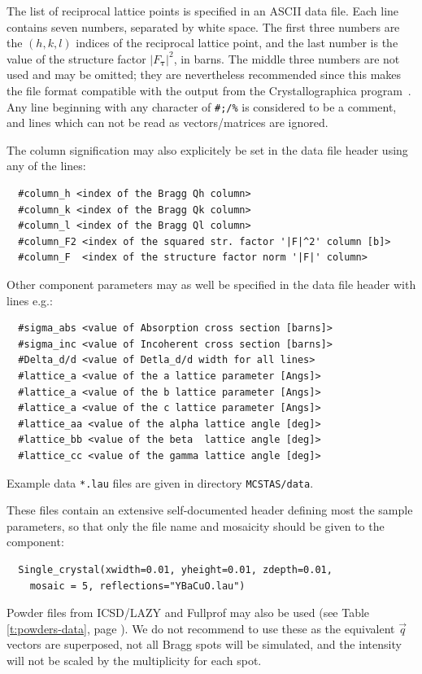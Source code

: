 The list of reciprocal lattice points is specified in an ASCII data
file. Each line contains seven numbers, separated by white space. The
first three numbers are the $(h,k,l)$ indices of the reciprocal lattice
point, and the last number is the value of the structure factor
$|F_{\boldsymbol{\tau}}|^2$, in barns. The middle three numbers are not
used and may be omitted; they are nevertheless recommended since this makes
the file format compatible with the output from the Crystallographica
program~\cite{crystallographica}.
Any line beginning with any character of \verb+#;/%+ is considered to be a
comment, and lines which can not be read as vectors/matrices are ignored.

The column signification may also explicitely be set in the data file header using any of the lines:
\begin{verbatim}
  #column_h <index of the Bragg Qh column>
  #column_k <index of the Bragg Qk column>
  #column_l <index of the Bragg Ql column>
  #column_F2 <index of the squared str. factor '|F|^2' column [b]>
  #column_F  <index of the structure factor norm '|F|' column>
\end{verbatim}

Other component parameters may as well be specified in the data file
header with lines e.g.:
\begin{verbatim}
  #sigma_abs <value of Absorption cross section [barns]>
  #sigma_inc <value of Incoherent cross section [barns]>
  #Delta_d/d <value of Detla_d/d width for all lines>
  #lattice_a <value of the a lattice parameter [Angs]>
  #lattice_a <value of the b lattice parameter [Angs]>
  #lattice_a <value of the c lattice parameter [Angs]>
  #lattice_aa <value of the alpha lattice angle [deg]>
  #lattice_bb <value of the beta  lattice angle [deg]>
  #lattice_cc <value of the gamma lattice angle [deg]>
\end{verbatim}

Example data \verb+*.lau+ files are given in directory \verb+MCSTAS/data+.

These files contain an extensive self-documented header defining most the sample parameters, so that only the file name and mosaicity should be given to the component:
\begin{verbatim}
  Single_crystal(xwidth=0.01, yheight=0.01, zdepth=0.01,
    mosaic = 5, reflections="YBaCuO.lau")
\end{verbatim}

Powder files from ICSD/LAZY \cite{icsd_ill} and Fullprof \cite{Fullprof}
may also be used (see Table \ref{t:powders-data}, page \pageref{t:powders-data}).
We do not recommend to use these as the equivalent $\vec q$ vectors are superposed, not
all Bragg spots will be simulated, and the intensity will not be scaled by the
multiplicity for each spot.

